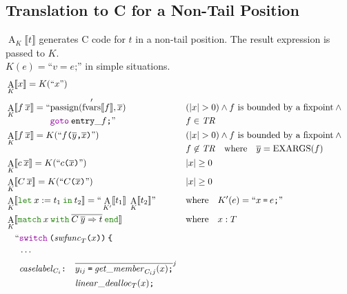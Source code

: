 \documentclass[a4paper,fleqn]{article}
\newcommand{\kwlet}{\mbox{\color{mygreen}\ttfamily let}}
\newcommand{\kwin}{\mbox{\color{mygreen}\ttfamily in}}
\newcommand{\kwmatch}{\mbox{\color{mygreen}\ttfamily match}}
\newcommand{\kwwith}{\mbox{\color{mygreen}\ttfamily with}}
\newcommand{\kwend}{\mbox{\color{mygreen}\ttfamily end}}
\newcommand{\letin}[3]{\kwlet\:#1:=#2\:\kwin\:#3}
\newcommand{\omatch}[2]{\kwmatch\:#1\:\kwwith\:{#2}\:\kwend}
\DeclareMathOperator{\EXARGS}{EXARGS}
\newcommand{\BRA}[1]{\llbracket #1 \rrbracket}
\newcommand{\tr}{\mathit{TR}}
\newcommand{\ldq}{\text{``}}
\newcommand{\rdq}{\text{''}}
\newcommand{\dq}[1]{\text{``}#1\text{''}}
\newcommand{\ttparen}[1]{\texttt{(}#1\texttt{)}}
\newcommand{\ttlbrace}{\texttt{\char '173}}
\newcommand{\tteq}{\texttt{=}}
\newcommand{\ttsemi}{\texttt{;}}
\newcommand{\ttcomma}{\texttt{,}}
\newcommand{\ttcolon}{\texttt{:}}
\newcommand{\kwswitch}{\mbox{\color{myviolet}\ttfamily switch}}
\newcommand{\kwgoto}{\mbox{\color{myviolet}\ttfamily goto}}
\DeclareMathOperator{\passign}{passign}
\DeclareMathOperator{\fvarsop}{fvars}
\newcommand{\fvarsd}[1]{\fvarsop'\BRA{#1}}
\DeclareMathOperator{\Aop}{A}
\newcommand{\A}[2]{\Aop_{#1}\BRA{#2}}
\newcommand{\rep}[1]{\overline{#1}}
\newcommand{\repi}[2]{\overline{#1}^{#2}}
\begin{document}
\subsection{Translation to C for a Non-Tail Position}\label{sec:AK}
$\A{K}{t}$ generates C code for $t$ in a non-tail position.
The result expression is passed to $K$. \\
$K(e) = \dq{v = e\ttsemi}$ in simple situations.
\begin{align*}
  &\A{K}{x} = K(\dq{x}) \\
  &\A{K}{f\:\rep{x}} =
      \begin{aligned}[t] \ldq & {\passign(\fvarsd{f}, \rep{x})} \\ & \kwgoto\:\mathtt{entry\_}f\ttsemi \rdq \end{aligned}
    && \begin{aligned}[t] & (|x| > 0) \wedge \text{$f$ is bounded by a fixpoint} \wedge {} \\ & f \in \tr \end{aligned} \\
  &\A{K}{f\:\rep{x}} = K(\dq{f\ttparen{\rep{y}\ttcomma \rep{x}}})
    && \begin{aligned}[t] & (|x| > 0) \wedge \text{$f$ is bounded by a fixpoint} \wedge {} \\ & f \not\in \tr \quad \text{where} \quad \rep{y} = \EXARGS(f) \end{aligned} \\
      &\A{K}{c\:\rep{x}} = K(\dq{c\ttparen{\rep{x}}})                                   && |x| \geq 0 \\
  &\A{K}{C\:\rep{x}} = K(\dq{C\ttparen{\rep{x}}})                                   && |x| \geq 0 \\
  &\A{K}{\letin{x}{t_1}{t_2}} = \ldq \A{K'}{t_1}\; \A{K}{t_2} \rdq
    && \text{where}\quad K'(e) = \dq{x\:\tteq\:e\ttsemi} \\
  &\A{K}{\omatch{x}{\rep{C\:\rep{y}\Rightarrow t}}} && \text{where}\quad x : T \\
     & \quad\begin{alignedat}{2}
       \ldq & \kwswitch\:\ttparen{\mathit{swfunc}_T\ttparen{x}}\:\ttlbrace \\
            & \cdots \\
            & \mathit{caselabel}_{C_i}\ttcolon\quad
              \begin{aligned}[t]
              & \repi{y_{ij}\:\tteq\:\mathit{get\_member}_{C_i j}(x)\ttsemi}{j} \\
              & \mathit{linear\_dealloc}_{T}(x)\ttsemi \\

\end{aligned}
\end{alignedat}
\end{align*}
\end{document}
